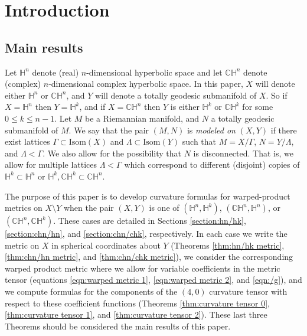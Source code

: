 \documentclass[10pt]{amsart}
\def\H{\mathbb{H}}
\def\C{\mathbb{C}}
\theoremstyle{definition}
\theoremstyle{remark}
\numberwithin{equation}{section}
\begin{document}


\section{Introduction}\label{Section:Introduction}

\subsection{Main results}
Let $\H^n$ denote (real) $n$-dimensional hyperbolic space and let $\C \H^n$ denote (complex) $n$-dimensional complex hyperbolic space.  
In this paper, $X$ will denote either $\H^n$ or $\C \H^n$, and $Y$ will denote a totally geodesic submanifold of $X$.  
So if $X = \H^n$ then $Y = \H^k$, and if $X = \C \H^n$ then $Y$ is either $\H^k$ or $\C \H^k$ for some $0 \leq k \leq n-1$.  
Let $M$ be a Riemannian manifold, and $N$ a totally geodesic submanifold of $M$.  
We say that the pair $(M, N)$ is {\it modeled on} $(X, Y)$ if there exist lattices $\Gamma \subset \text{Isom}(X)$ and $\Lambda \subset \text{Isom}(Y)$ such that $M = X / \Gamma$, $N = Y / \Lambda$, and $\Lambda < \Gamma$.  
We also allow for the possibility that $N$ is disconnected.  
That is, we allow for multiple lattices $\Lambda < \Gamma$ which correspond to different (disjoint) copies of $\H^k \subset \H^n$ or $\H^k, \C \H^k \subset \C \H^n$.  

The purpose of this paper is to develop curvature formulas for warped-product metrics on $X \setminus Y$ when the pair $(X, Y)$ is one of $(\H^n, \H^k)$, $(\C \H^n, \H^n)$, or $(\C \H^n, \C \H^k)$.  
These cases are detailed in Sections \ref{section:hn/hk}, \ref{section:chn/hn}, and \ref{section:chn/chk}, respectively.  
In each case we write the metric on $X$ in spherical coordinates about $Y$ (Theorems \ref{thm:hn/hk metric}, \ref{thm:chn/hn metric}, and \ref{thm:chn/chk metric}), we consider the corresponding warped product metric where we allow for variable coefficients in the metric tensor (equations \eqref{eqn:warped metric 1}, \eqref{eqn:warped metric 2}, and \eqref{eqn:/g}), and we compute formulas for the components of the $(4,0)$ curvature tensor with respect to these coefficient functions (Theorems \ref{thm:curvature tensor 0}, \ref{thm:curvature tensor 1}, and \ref{thm:curvature tensor 2}).  
These last three Theorems should be considered the main results of this paper.
\end{document}
